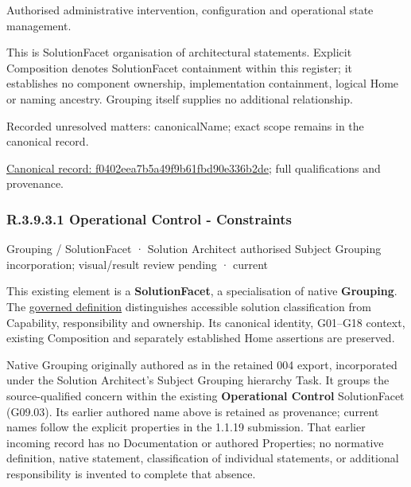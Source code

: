 Authorised administrative intervention, configuration and operational state management.



This is SolutionFacet organisation of architectural statements. Explicit Composition denotes SolutionFacet containment within this register; it establishes no component ownership, implementation containment, logical Home or naming ancestry. Grouping itself supplies no additional relationship.


{\small Recorded unresolved matters: canonicalName; exact scope remains in the canonical record.}\par
{\footnotesize \href{../../../../../../../continuum/grouping/f0402eea7b5a49f9b61fbd90e336b2de.md}{Canonical record: f0402eea7b5a49f9b61fbd90e336b2de}; full qualifications and provenance.}\par
\subsubsection*{R.3.9.3.1 Operational Control - Constraints}
\label{navigation:R.3.9.3.1}

\label{element:445d396942f549e5891086bd72fa5b44}
{\small Grouping / SolutionFacet · Solution Architect authorised Subject Grouping incorporation; visual/result review pending · current}\par

This existing element is a \textbf{SolutionFacet}, a specialisation of native
\textbf{Grouping}. The \href{\detokenize{../../../../../../../governance/continuum-representation.md#solutionfacet-classification--1119-candidate}}{governed definition}
distinguishes accessible solution classification from Capability, responsibility
and ownership. Its canonical identity, G01–G18 context, existing Composition
and separately established Home assertions are preserved.



Native Grouping originally authored as \texttt{} in the retained 004 export,
incorporated under the Solution Architect's Subject Grouping hierarchy Task.
It groups the source-qualified \texttt{} concern within
the existing \textbf{Operational Control} SolutionFacet (G09.03). Its earlier authored name above is retained as provenance; current names
follow the explicit properties in the 1.1.19 submission.
That earlier incoming record has no Documentation or authored Properties; no normative
definition, native statement, classification of individual statements, or
additional responsibility is invented to complete that absence.



